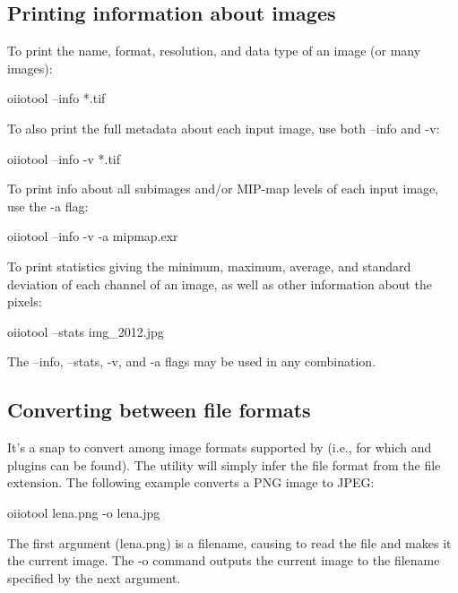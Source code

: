 \subsection*{Printing information about images}

To print the name, format, resolution, and data type of an image
(or many images):

\begin{code}
    oiiotool --info *.tif
\end{code}

\noindent To also print the full metadata about each input image, use both
{\cf --info} and {\cf -v}:

\begin{code}
    oiiotool --info -v *.tif
\end{code}

\noindent To print info about all subimages and/or MIP-map levels of each
input image, use the {\cf -a} flag:

\begin{code}
    oiiotool --info -v -a mipmap.exr
\end{code}

\noindent To print statistics giving the minimum, maximum, average, and
standard deviation of each channel of an image, as well as other
information about the pixels:

\begin{code}
    oiiotool --stats img_2012.jpg
\end{code}

\noindent The {\cf --info}, {\cf --stats}, {\cf -v}, and {\cf -a} flags may
be used in any combination.


\subsection*{Converting between file formats}

It's a snap to convert among image formats supported by \product
(i.e., for which \ImageInput and \ImageOutput plugins can be found).
The \oiiotool utility will simply infer the file format from the
file extension. The following example converts a PNG image to JPEG:

\begin{code}
    oiiotool lena.png -o lena.jpg
\end{code}

The first argument ({\cf lena.png}) is a filename, causing \oiiotool to
read the file and makes it the current image.  The {\cf -o} command
outputs the current image to the filename specified by the next
argument.


